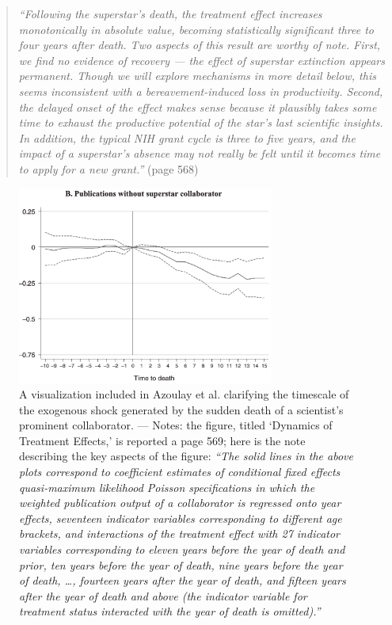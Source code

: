 \documentclass[11pt]{article}
\begin{document}
\begin{refsection}
\begin{quote}
  \textit{
    ``Following the superstar's death, the treatment effect increases
    monotonically in absolute value, becoming statistically significant three to
    four years after death. Two aspects of this result are worthy of note.
    First, we find no evidence of recovery --- the effect of superstar
    extinction appears permanent. Though we will explore mechanisms in more
    detail below, this seems inconsistent with a bereavement-induced loss in
    productivity.  Second, the delayed onset of the effect makes sense because
    it plausibly takes some time to exhaust the productive potential of the
    star's last scientific insights. In addition, the typical NIH grant cycle is
    three to five years, and the impact of a superstar's absence may not really
    be felt until it becomes time to apply for a new grant.''
  }
  (page 568)
\end{quote}

\begin{figure}[!htbp]
    \begin{center}
     
\includegraphics[width=0.75\textwidth]{exhibits/from_azoulay_et_al_2010.png}
    \end{center}
    \caption{A visualization included in Azoulay et al. 
    \autocite*[][]{azoulay_et_al_2010} clarifying the timescale of the exogenous
    shock generated by the sudden death of a scientist's prominent collaborator.
    --- Notes: the figure, titled `Dynamics of Treatment Effects,' is reported a
    page 569; here is the note describing the key aspects of the figure: \textit{``The
    solid lines in the above plots correspond to coefficient estimates of
    conditional fixed effects quasi-maximum likelihood Poisson specifications in
    which the weighted publication output of a collaborator is regressed onto
    year effects, seventeen indicator variables corresponding to different age
    brackets, and interactions of the treatment effect with 27 indicator
    variables corresponding to eleven years before the year of death and prior,
    ten years before the year of death, nine years before the year of death,
    \ldots, fourteen years after the year of death, and fifteen years after the
    year of death and above (the indicator variable for treatment status
    interacted with the year of death is omitted).''}}
    \label{fig:azoulay_et_al_2010}
\end{figure}


\end{refsection}
\end{document}
